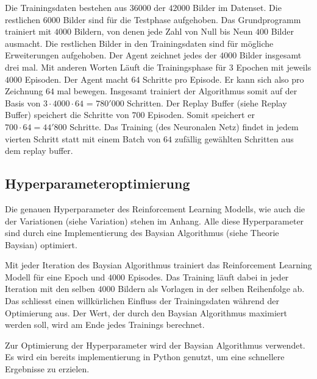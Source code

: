 Die Trainingsdaten bestehen aus $36000$ der $42000$ Bilder im Datenset. Die
restlichen $6000$ Bilder sind für die Testphase aufgehoben. Das Grundprogramm
trainiert mit $4000$ Bildern, von denen jede Zahl von Null bis Neun $400$ Bilder
ausmacht. Die restlichen Bilder in den Trainingsdaten sind für mögliche
Erweiterungen aufgehoben. Der Agent zeichnet jedes der $4000$ Bilder insgesamt
drei mal. Mit anderen Worten Läuft die Trainingsphase für $3$ Epochen mit
jeweils $4000$ Episoden. Der Agent macht $64$ Schritte pro Episode. Er kann sich
also pro Zeichnung $64$ mal bewegen. Insgesamt trainiert der Algorithmus somit
auf der Basis von $3\cdot4000\cdot64$ = $780'000$ Schritten. Der Replay Buffer
(siehe Replay Buffer) speichert die Schritte von $700$ Episoden. Somit speichert  %
er $700\cdot64 = 44'800$ Schritte. Das Training (des Neuronalen Netz) findet in
jedem vierten Schritt statt mit einem Batch von $64$ zufällig gewählten
Schritten aus dem replay buffer.

\subsection{Hyperparameteroptimierung}
\label{chap:Hyperparameter Optimierung}
Die genauen Hyperparameter des Reinforcement Learning Modells, wie auch die der     
Variationen (siehe Variation) stehen im Anhang. Alle diese Hyperparameter sind    %
durch eine Implementierung des Baysian Algorithmus \cite{fernando_bayesian_2022}
(siehe Theorie Baysian) optimiert.

Mit jeder Iteration des Baysian Algorithmus trainiert das Reinforcement Learning
Modell für eine Epoch und $4000$ Episodes. Das Training läuft dabei in jeder
Iteration mit den selben $4000$ Bildern als Vorlagen in der selben Reihenfolge
ab. Das schliesst einen willkürlichen Einfluss der Trainingsdaten während der
Optimierung aus. Der Wert, der durch den Baysian Algorithmus maximiert werden
soll, wird am Ende jedes Trainings berechnet. 





Zur Optimierung der Hyperparameter wird der Baysian Algorithmus verwendet. Es
wird ein bereits implementierung in Python genutzt, um eine schnellere
Ergebnisse zu erzielen. \cite{fernando_bayesian_2022}

